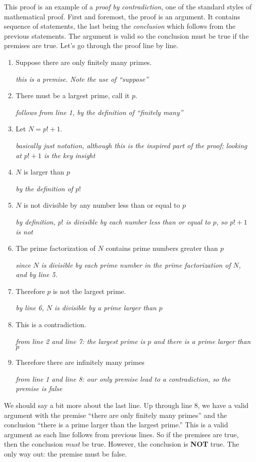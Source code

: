 \documentclass[12pt]{article}
\begin{document}
 This proof is an example of a {\em proof by contradiction}, one of the standard styles of mathematical proof.  First and foremost, the proof is an argument.  It contains sequence of statements, the last being the {\em conclusion} which follows from the previous statements.  The argument is valid so the conclusion must be true if the premises are true.  Let's go through the proof line by line.
 
 \begin{enumerate}
  \item Suppose there are only finitely many primes.
 
 \hfill{\em this is a premise.  Note the use of ``suppose''}
 \item  There must be a largest prime, call it $p$. 
 
 \hfill{\em follows from line 1, by the definition of ``finitely many''}
 \item Let $N = p! + 1$.
 
 \hfill {\em basically just notation, although this is the inspired part of the proof; looking at $p! + 1$ is the key insight}
 \item $N$ is larger than $p$
 
 \hfill {\em by the definition of $p!$}
 \item $N$ is not divisible by any number less than or equal to $p$ 
 
 \hfill {\em by definition, $p!$ is divisible by each number less than or equal to $p$, so $p! + 1$ is not}
 \item The prime factorization of $N$ contains prime numbers greater than $p$ 
 
 \hfill {\em since $N$ is divisible by each prime number in the prime factorization of $N$, and by line 5.}
 \item Therefore $p$ is not the largest prime.
 
 \hfill {\em by line 6, $N$ is divisible by a prime larger than $p$}
 \item This is a contradiction.
 
 \hfill {\em from line 2 and line 7: the largest prime is $p$ and there is a prime larger than $p$}
 \item Therefore there are infinitely many primes
 
 \hfill {\em from line 1 and line 8: our only premise lead to a contradiction, so the premise is false}
 \end{enumerate}
 
 We should say a bit more about the last line.  Up through line 8, we have a valid argument with the premise ``there are only finitely many primes'' and the conclusion ``there is a prime larger than the largest prime.''  This is a valid argument as each line follows from previous lines.  So if the premises are true, then the conclusion \emph{must} be true.  However, the conclusion is \textbf{NOT} true.  The only way out: the premise must be false.  
 
\end{document}
